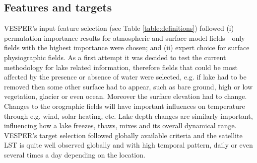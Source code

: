 \documentclass[hess, twostagejnl]{copernicus}
\begin{document}
\subsection{Features and targets}
VESPER's input feature selection (see Table \ref{table:definitions}) followed (i) permutation importance results for atmospheric and surface model fields - only fields with the highest importance were chosen; and (ii) expert choice for surface physiographic fields. As a first attempt it was decided to test the current methodology for lake related information, therefore fields that could be most affected by the presence or absence of water were selected, e.g. if lake had to be removed then some other surface had to appear, such as bare ground, high or low vegetation, glacier or even ocean. Moreover the surface elevation had to change. Changes to the orographic fields will have important influences on temperature through e.g. wind, solar heating, etc. Lake depth changes are similarly important, influencing how a lake freezes, thaws, mixes and its overall dynamical range. VESPER's target selection followed globally available criteria and the satellite LST is quite well observed globally and with high temporal pattern, daily or even several times a day depending on the location.
\end{document}
